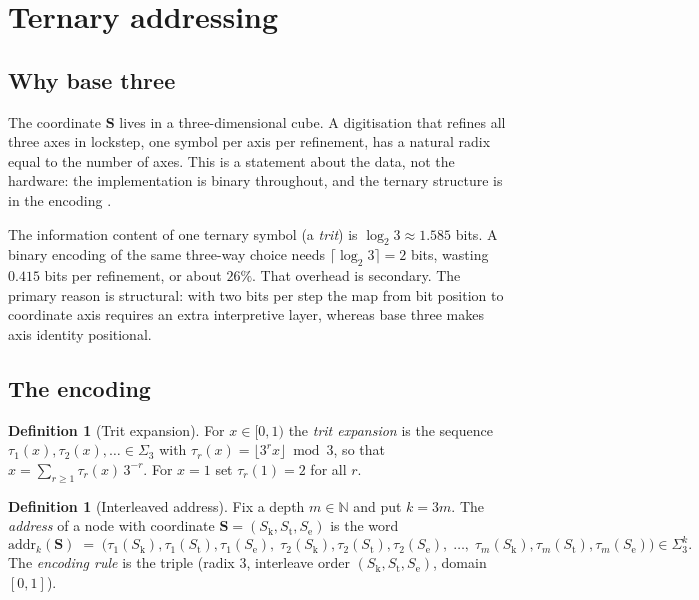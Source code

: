 \documentclass[11pt,twocolumn,a4paper]{article}
\theoremstyle{plain}
\theoremstyle{definition}
\newtheorem{definition}[theorem]{Definition}
\theoremstyle{remark}
\newcommand{\Sk}{S_{\mathrm{k}}}
\newcommand{\St}{S_{\mathrm{t}}}
\newcommand{\Se}{S_{\mathrm{e}}}
\newcommand{\Scoord}{\mathbf{S}}
\newcommand{\addr}{\mathrm{addr}}
\newcommand{\Trits}{\Sigma_3}
\newcommand{\Nset}{\mathbb{N}}
\begin{document}
\section{Ternary addressing}
\label{sec:addressing}

\subsection{Why base three}

The coordinate $\Scoord$ lives in a three-dimensional cube. A digitisation that
refines all three axes in lockstep, one symbol per axis per refinement, has a
natural radix equal to the number of axes. This is a statement about the data,
not the hardware: the implementation is binary throughout, and the ternary
structure is in the encoding \citep{Knuth1997}.

The information content of one ternary symbol (a \emph{trit}) is
$\log_2 3 \approx 1.585$ bits. A binary encoding of the same three-way choice
needs $\lceil \log_2 3\rceil = 2$ bits, wasting $0.415$ bits per refinement, or
about $26\%$. That overhead is secondary. The primary reason is structural: with
two bits per step the map from bit position to coordinate axis requires an extra
interpretive layer, whereas base three makes axis identity positional.

\subsection{The encoding}

\begin{definition}[Trit expansion]
\label{def:trit}
For $x \in [0,1)$ the \emph{trit expansion} is the sequence
$\tau_1(x),\tau_2(x),\dots \in \Trits$ with
$\tau_r(x) = \lfloor 3^r x\rfloor \bmod 3$, so that
$x = \sum_{r\ge1} \tau_r(x)\,3^{-r}$. For $x = 1$ set $\tau_r(1) = 2$ for all $r$.
\end{definition}

\begin{definition}[Interleaved address]
\label{def:encoding}
Fix a depth $m \in \Nset$ and put $k = 3m$. The \emph{address} of a node with
coordinate $\Scoord = (\Sk,\St,\Se)$ is the word
\begin{equation}
\addr_k(\Scoord) \;=\;
\bigl(\tau_1(\Sk),\tau_1(\St),\tau_1(\Se),\;
      \tau_2(\Sk),\tau_2(\St),\tau_2(\Se),\;\dots,\;
      \tau_m(\Sk),\tau_m(\St),\tau_m(\Se)\bigr) \in \Trits^{k}.
\label{eq:addr}
\end{equation}
The \emph{encoding rule} is the triple (radix $3$, interleave order
$(\Sk,\St,\Se)$, domain $[0,1]$).
\end{definition}
\end{document}
